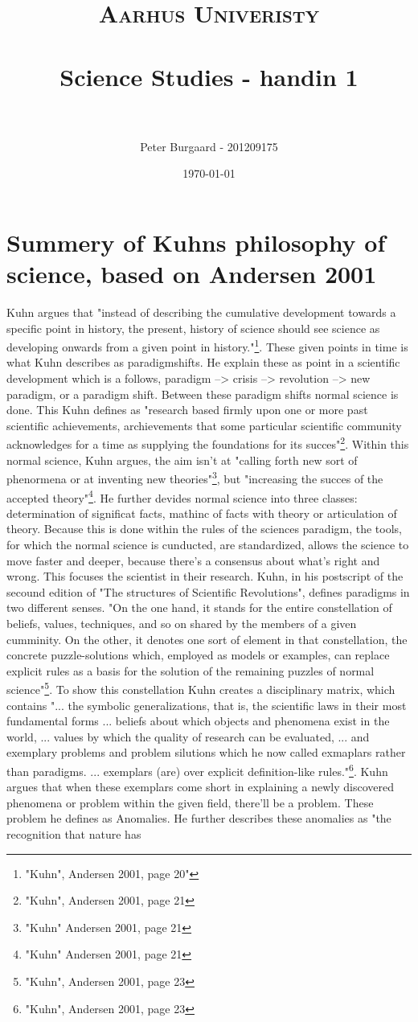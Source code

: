 \documentclass[paper=a4, fontsize=11pt]{scrartcl} %
\title{	
	\normalfont \normalsize 
	\textsc{Aarhus Univeristy} \\ [25pt] %
	\horrule{0.5pt} \\[0.4cm] %
	\huge Science Studies - handin 1 \\ %
	\horrule{2pt} \\[0.5cm] %
}
\author{Peter Burgaard - 201209175} %
\date{\normalsize\today} %
\numberwithin{equation}{section} %
\numberwithin{figure}{section} %
\numberwithin{table}{section} %
\begin{document}
	
	\maketitle %
	
	\section{Summery of Kuhns philosophy of science, based on Andersen 2001}
	
	Kuhn argues that "instead of describing the cumulative development towards a specific point in history, the present, history of science should see science as developing onwards from a given point in history."\footnote{"Kuhn", Andersen 2001, page 20"}. These given points in time is what Kuhn describes as paradigmshifts. He explain these as point in a scientific development which is a follows, paradigm --> crisis --> revolution --> new paradigm, or a paradigm shift. Between these paradigm shifts normal science is done. This Kuhn defines as "research based firmly upon one or more past scientific achievements, archievements that some particular scientific community acknowledges for a time as supplying the foundations for its succes"\footnote{"Kuhn", Andersen 2001, page 21}. Within this normal science, Kuhn argues, the aim isn't at "calling forth new sort of phenormena or at inventing new theories"\footnote{"Kuhn" Andersen 2001, page 21}, but "increasing the succes of the accepted theory"\footnote{"Kuhn" Andersen 2001, page 21}. He further devides normal science into three classes: determination of significat facts, mathinc of facts with theory or articulation of theory. Because this is done within the rules of the sciences paradigm, the tools, for which the normal science is cunducted, are standardized, allows the science to move faster and deeper, because there's a consensus about what's right and wrong. This focuses the scientist in their research. Kuhn, in his postscript of the secound edition of "The structures of Scientific Revolutions", defines paradigms in two different senses. "On the one hand, it stands for the entire constellation of beliefs, values, techniques, and so on shared by the members of a given cumminity. On the other, it denotes one sort of element in that constellation, the concrete puzzle-solutions which, employed as models or examples, can replace explicit rules as a basis for the solution of the remaining puzzles of normal science"\footnote{"Kuhn", Andersen 2001, page 23}. To show this constellation Kuhn creates a disciplinary matrix, which contains "... the symbolic generalizations, that is, the scientific laws in their most fundamental forms ... beliefs about which objects and phenomena exist in the world, ... values by which the quality of research can be evaluated, ... and exemplary problems and problem silutions which he now called exmaplars rather than paradigms. ... exemplars (are) over explicit definition-like rules."\footnote{"Kuhn", Andersen 2001, page 23}. Kuhn argues that when these exemplars come short in explaining a newly discovered phenomena or problem within the given field, there'll be a problem. These problem he defines as Anomalies. He further describes these anomalies as "the recognition that nature has 
\end{document}
